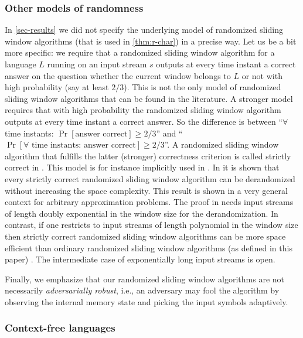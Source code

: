 \documentclass{article}\usepackage[a4paper,margin=20mm]{geometry}
\renewcommand{\geq}{\geqslant}
\begin{document}
\subsubsection{Other models of randomness}

In \cref{sec-results} we did not specify the underlying model of randomized sliding window algorithms (that is used
in \cref{thm:r-char}) in a precise way. Let us be a bit more specific: we require that a randomized sliding window 
algorithm for a language $L$ running  on an input stream $s$ outputs at every time instant a correct answer on the question whether
the current window belongs to $L$ or not with high probability (say at least $2/3$). This is not the only model of 
randomized sliding window algorithms that can be found in the literature. A stronger model requires that with high
probability the randomized sliding window algorithm outputs at every time instant a correct answer. So the difference
is between ``$\forall$ time instants: $\Pr[\text{answer correct}] \geq 2/3$'' and 
``$\Pr[\text{$\forall$ time instants: answer correct}] \geq 2/3$''. A randomized sliding window algorithm 
that fulfills the latter (stronger) correctness criterion is called strictly correct in \cite{GanardiHLTOCS21}. 
This model is for instance implicitly used in \cite{Ben-BasatEFK16,DatarGIM02}. In \cite{GanardiHLTOCS21} it is shown that every strictly correct 
 randomized sliding window algorithm can be derandomized without increasing the space complexity.
 This result is shown in a very general context for arbitrary approximation problems. 
The proof in \cite{GanardiHLTOCS21} needs input streams of length doubly exponential in the window size for the derandomization.
In contrast, if one restricts to input streams of length polynomial in the window size then strictly correct randomized sliding
window algorithms can be more space efficient than ordinary randomized sliding
window algorithms (as defined in this paper) \cite{GanardiHLTOCS21}. The intermediate case of exponentially long input streams is open.

Finally, we emphasize that our randomized sliding window algorithms are not necessarily \emph{adversarially robust}, 
i.e., an adversary may fool the algorithm by observing the internal memory state and picking the input symbols adaptively.

\subsubsection{Context-free languages} \label{sec-context-free}
\end{document}
